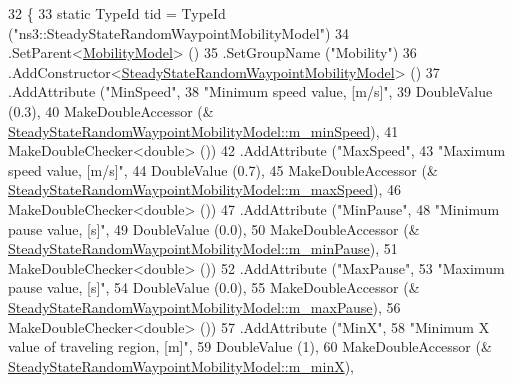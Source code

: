 \begin{DoxyCode}
32 \{
33   \textcolor{keyword}{static} TypeId tid = TypeId (\textcolor{stringliteral}{"ns3::SteadyStateRandomWaypointMobilityModel"})
34     .SetParent<\hyperlink{classns3_1_1MobilityModel_af61ca3dbc723d8109d115fb081fd0299}{MobilityModel}> ()
35     .SetGroupName (\textcolor{stringliteral}{"Mobility"})
36     .AddConstructor<\hyperlink{classns3_1_1SteadyStateRandomWaypointMobilityModel_abe26fde19d726cac14d0d21478e17a72}{SteadyStateRandomWaypointMobilityModel}> ()
37     .AddAttribute (\textcolor{stringliteral}{"MinSpeed"},
38                    \textcolor{stringliteral}{"Minimum speed value, [m/s]"},
39                    DoubleValue (0.3),
40                    MakeDoubleAccessor (&
      \hyperlink{classns3_1_1SteadyStateRandomWaypointMobilityModel_a8a5945ad51a5e5698154b28c81928af9}{SteadyStateRandomWaypointMobilityModel::m\_minSpeed}),
41                    MakeDoubleChecker<double> ())
42     .AddAttribute (\textcolor{stringliteral}{"MaxSpeed"},
43                    \textcolor{stringliteral}{"Maximum speed value, [m/s]"},
44                    DoubleValue (0.7),
45                    MakeDoubleAccessor (&
      \hyperlink{classns3_1_1SteadyStateRandomWaypointMobilityModel_a2e0b9a58625f4c4af3559b3362e3fad2}{SteadyStateRandomWaypointMobilityModel::m\_maxSpeed}),
46                    MakeDoubleChecker<double> ())
47     .AddAttribute (\textcolor{stringliteral}{"MinPause"},
48                    \textcolor{stringliteral}{"Minimum pause value, [s]"},
49                    DoubleValue (0.0),
50                    MakeDoubleAccessor (&
      \hyperlink{classns3_1_1SteadyStateRandomWaypointMobilityModel_a2f2c459cb15ccdc6b1ca7b189b48f2b4}{SteadyStateRandomWaypointMobilityModel::m\_minPause}),
51                    MakeDoubleChecker<double> ())
52     .AddAttribute (\textcolor{stringliteral}{"MaxPause"},
53                    \textcolor{stringliteral}{"Maximum pause value, [s]"},
54                    DoubleValue (0.0),
55                    MakeDoubleAccessor (&
      \hyperlink{classns3_1_1SteadyStateRandomWaypointMobilityModel_a8986b6ac8a22e230e7596763d973af07}{SteadyStateRandomWaypointMobilityModel::m\_maxPause}),
56                    MakeDoubleChecker<double> ())
57     .AddAttribute (\textcolor{stringliteral}{"MinX"},
58                    \textcolor{stringliteral}{"Minimum X value of traveling region, [m]"},
59                    DoubleValue (1),
60                    MakeDoubleAccessor (&
      \hyperlink{classns3_1_1SteadyStateRandomWaypointMobilityModel_a37f6b6cb1d31fce26b84b817831b1e24}{SteadyStateRandomWaypointMobilityModel::m\_minX}),

\end{DoxyCode}
